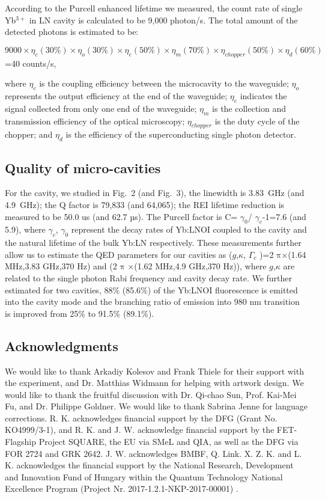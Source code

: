\documentclass[prl,reprint,superscriptaddress]{revtex4-1}
\begin{document}
According to the Purcell enhanced lifetime we measured, the count rate of single Yb$^{3+}$ in LN cavity is calculated to be 9,000 photon/s. The total amount of the detected photons is estimated to be:

$9000\times\eta_c (30\%)\times\eta_o (30\%)\times\eta_e (50\%)\times\eta_m (70\%)\times\eta_{chopper} (50\%)\times\eta_d (60\%)$
=40 counts/s,

where $\eta_c$ is the coupling efficiency between the microcavity to the waveguide; $\eta_o$ represents the output efficiency at the end of the waveguide; $\eta_e$ indicates the signal collected from only one end of the waveguide; $\eta_{m}$ is the collection and transmission efficiency of the optical microscopy;  $\eta_{chopper}$ is the duty cycle of the chopper; and $\eta_{d}$ is the efficiency of the superconducting single photon detector.

\subsection{Quality of  micro-cavities}
      For the cavity, we studied in Fig.~2 (and Fig.~3), the linewidth is 3.83~GHz (and 4.9~GHz); the Q factor is 79,833 (and 64,065); the REI lifetime reduction is measured to be 50.0 us (and 62.7 µs). The Purcell factor is C= $\gamma_0$/ $\gamma_c$-1=7.6 (and 5.9), where $\gamma_c$, $\gamma_0$ represent the decay rates of Yb:LNOI coupled to the cavity and the natural lifetime of the bulk Yb:LN respectively. These measurements further allow us to estimate the QED parameters for our cavities as ($g$,$\kappa$, $\Gamma_c$ )=2
     $\mathrm{\pi}$×(1.64 MHz,3.83 GHz,370 Hz) and (2 $\mathrm{\pi}$ ×(1.62 MHz,4.9 GHz,370 Hz)), where $g$,$\kappa$ are related to the single photon Rabi frequency and cavity decay rate. 
      We further estimated for two cavities, 88\% (85.6\%) of the Yb:LNOI fluorescence is  emitted into the cavity mode and the branching ratio of emission into 980 nm transition is improved from 25\% to 91.5\% (89.1\%).



\subsection{Acknowledgments}
We would like to thank Arkadiy Kolesov and Frank Thiele for their support with the experiment, and Dr. Matthias Widmann for helping with artwork design. We would like to thank the fruitful discussion with Dr. Qi-chao Sun, Prof. Kai-Mei Fu, and Dr. Philippe Goldner. We would like to thank Sabrina Jenne for language corrections. R. K. acknowledges financial support by the DFG (Grant No. KO4999/3-1), and R. K. and J. W. acknowledge financial support by the FET-Flagship Project SQUARE, the EU via SMeL and QIA, as well as the DFG via FOR 2724 and GRK 2642. J. W. acknowledges BMBF, Q. Link. X.  Z. K. and L. K. acknowledges the financial support by the National Research, Development and Innovation Fund of Hungary within the Quantum Technology National Excellence Program (Project Nr. 2017-1.2.1-NKP-2017-00001) .
\end{document}

